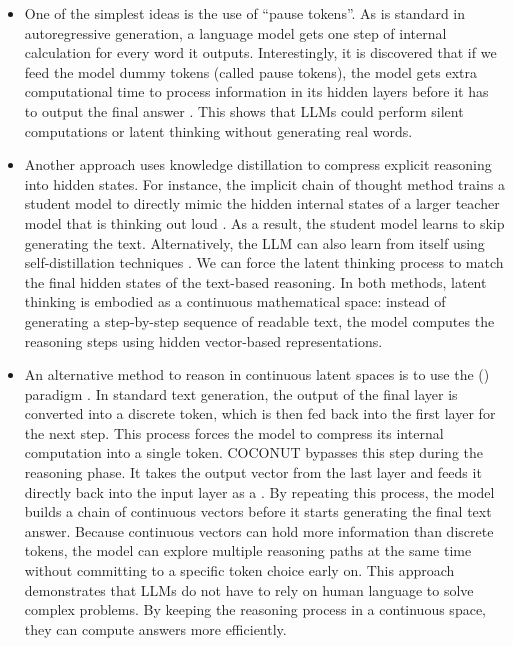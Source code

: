 \begin{itemize}
\item \vspace{0.5cm} One of the simplest ideas is the use of ``pause tokens''. As is standard in autoregressive generation, a language model gets one step of internal calculation for every word it outputs. Interestingly, it is discovered that if we feed the model dummy tokens (called pause tokens), the model gets extra computational time to process information in its hidden layers before it has to output the final answer \cite{goyal-etal:2024think}. This shows that LLMs could perform silent computations or latent thinking without generating real words.
\item \vspace{0.3cm} Another approach uses knowledge distillation to compress explicit reasoning into hidden states. For instance, the implicit chain of thought method trains a student model to directly mimic the hidden internal states of a larger teacher model that is thinking out loud \cite{deng-etal:2023implicit}. As a result, the student model learns to skip generating the text. Alternatively, the LLM can also learn from itself using self-distillation techniques \cite{shen-etal:2025codi}. We can force the latent thinking process to match the final hidden states of the text-based reasoning. In both methods, latent thinking is embodied as a continuous mathematical space: instead of generating a step-by-step sequence of readable text, the model computes the reasoning steps using hidden vector-based representations.
\item \vspace{0.3cm} An alternative method to reason in continuous latent spaces is to use the  () paradigm \cite{hao-etal:2025training}. In standard text generation, the output of the final layer is converted into a discrete token, which is then fed back into the first layer for the next step. This process forces the model to compress its internal computation into a single token. COCONUT bypasses this step during the reasoning phase. It takes the output vector from the last layer and feeds it directly back into the input layer as a . By repeating this process, the model builds a chain of continuous vectors before it starts generating the final text answer. Because continuous vectors can hold more information than discrete tokens, the model can explore multiple reasoning paths at the same time without committing to a specific token choice early on. This approach demonstrates that LLMs do not have to rely on human language to solve complex problems. By keeping the reasoning process in a continuous space, they can compute answers more efficiently.

\end{itemize}
